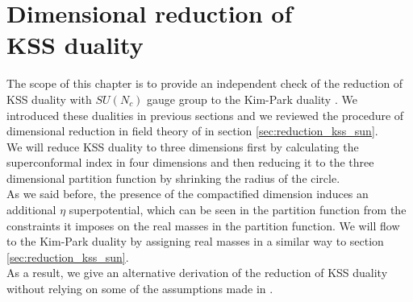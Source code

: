 

\chapter{Dimensional reduction of \\ KSS duality}

%
The scope of this chapter is to provide an independent check  of the reduction of KSS duality with $SU(N_c)$ gauge group to the Kim-Park duality \cite{Nii:2014jsa}.
We introduced these dualities in previous sections and we reviewed the procedure of dimensional reduction in field theory of \cite{Nii:2014jsa} in section \ref{sec:reduction_kss_sun}.\\
We will reduce KSS duality to three dimensions first by calculating the superconformal index in four dimensions and then reducing it to the three dimensional partition function by shrinking the radius of the circle.\\
As we said before, the presence of the compactified dimension induces an additional $\eta$ superpotential, which can be seen in the partition function from the constraints it imposes on the real masses in the partition function.
We will flow to the Kim-Park duality by assigning real masses in a similar way to section \ref{sec:reduction_kss_sun}.\\
As a result, we give an alternative derivation of the reduction of KSS duality without relying on some of the assumptions made in \cite{Nii:2014jsa}.







